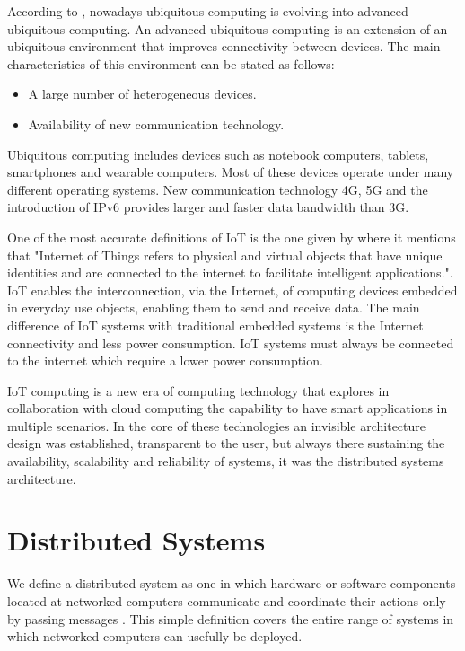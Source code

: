 According to \cite{Nur}, nowadays ubiquitous computing is evolving into
advanced ubiquitous computing. An advanced ubiquitous computing is an extension
of an ubiquitous environment that improves connectivity between devices. The
main characteristics of this environment can be stated as follows: 

\begin{itemize}
\item A large number of heterogeneous devices.
\item Availability of new communication technology.
\end{itemize}

Ubiquitous computing includes devices such as notebook computers, tablets, smartphones
and wearable computers. Most of these devices operate under many different
operating systems. New communication technology 4G, 5G and the introduction of
IPv6 provides larger and faster data bandwidth than 3G.

One of the most accurate definitions of IoT is the one given by \cite{Bahga}
where it mentions that "Internet of Things refers to physical and virtual
objects that have unique identities and are connected to the internet to
facilitate intelligent applications.". IoT enables the interconnection, via the
Internet, of computing devices embedded in everyday use objects, enabling them
to send and receive data. The main difference of IoT systems with traditional
embedded systems is the Internet connectivity and less power consumption. IoT
systems must always be connected to the internet which require a lower power
consumption.

IoT computing is a new era of computing technology that explores in
collaboration with cloud computing the capability to have smart applications in
multiple scenarios. In the core of these technologies an invisible architecture
design was established, transparent to the user, but always there sustaining
the availability, scalability and reliability of systems, it was the
distributed systems architecture.

\section{Distributed Systems}
\noindent

We define a distributed system as one in which hardware or software components
located at networked computers communicate and coordinate their actions only by
passing messages \cite{Coulouris}. This simple definition covers the entire
range of systems in which networked computers can usefully be deployed.

